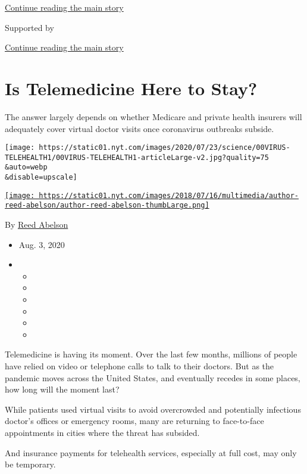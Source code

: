 \protect\hyperlink{after-top}{Continue reading the main story}

Supported by

\protect\hyperlink{after-sponsor}{Continue reading the main story}

\hypertarget{is-telemedicine-here-to-stay}{%
\section{Is Telemedicine Here to
Stay?}\label{is-telemedicine-here-to-stay}}

The answer largely depends on whether Medicare and private health
insurers will adequately cover virtual doctor visits once coronavirus
outbreaks subside.

\texttt{[image: https://static01.nyt.com/images/2020/07/23/science/00VIRUS-TELEHEALTH1/00VIRUS-TELEHEALTH1-articleLarge-v2.jpg?quality=75\\\&auto=webp\\\&disable=upscale]}

\href{https://www.nytimes.com/by/reed-abelson}{\texttt{[image: https://static01.nyt.com/images/2018/07/16/multimedia/author-reed-abelson/author-reed-abelson-thumbLarge.png]}}

By \href{https://www.nytimes.com/by/reed-abelson}{Reed Abelson}

\begin{itemize}
\item
  Aug. 3, 2020
\item
  \begin{itemize}
  \item
  \item
  \item
  \item
  \item
  \item
  \end{itemize}
\end{itemize}

Telemedicine is having its moment. Over the last few months, millions of
people have relied on video or telephone calls to talk to their doctors.
But as the pandemic moves across the United States, and eventually
recedes in some places, how long will the moment last?

While patients used virtual visits to avoid overcrowded and potentially
infectious doctor's offices or emergency rooms, many are returning to
face-to-face appointments in cities where the threat has subsided.

And insurance payments for telehealth services, especially at full cost,
may only be temporary.

